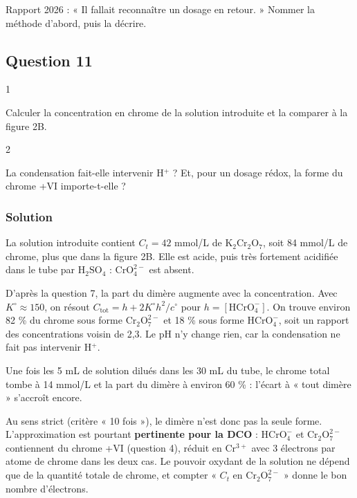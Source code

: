 \documentclass[11pt,a4paper]{article}
\begin{document}
\begin{jury}

Rapport 2026 : « Il fallait reconnaître un dosage en retour. » Nommer la méthode d'abord, puis la décrire.

\end{jury}

\hypertarget{question-11}{%
\subsection{Question 11}\label{question-11}}

\begin{indication}{1}

Calculer la concentration en chrome de la solution introduite et la comparer à la figure 2B.

\end{indication}

\begin{indication}{2}

La condensation fait-elle intervenir H\(^+\) ? Et, pour un dosage rédox, la forme du chrome +VI importe-t-elle ?

\end{indication}

\hypertarget{solution-10}{%
\subsubsection{Solution}\label{solution-10}}

La solution introduite contient \(C_t=42\) mmol/L de \(\mathrm{K_2Cr_2O_7}\), soit 84 mmol/L de chrome, plus que dans la figure 2B. Elle est acide, puis très fortement acidifiée dans le tube par \(\mathrm{H_2SO_4}\) : \(\mathrm{CrO_4^{2-}}\) est absent.

D'après la question 7, la part du dimère augmente avec la concentration. Avec \(K^\circ\approx150\), on résout \(C_{\text{tot}}=h+2K^\circ h^2/c^\circ\) pour \(h=[\mathrm{HCrO_4^-}]\). On trouve environ 82 \% du chrome sous forme \(\mathrm{Cr_2O_7^{2-}}\) et 18 \% sous forme \(\mathrm{HCrO_4^-}\), soit un rapport des concentrations voisin de 2,3. Le pH n'y change rien, car la condensation ne fait pas intervenir H\(^+\).

Une fois les 5 mL de solution dilués dans les 30 mL du tube, le chrome total tombe à 14 mmol/L et la part du dimère à environ 60 \% : l'écart à « tout dimère » s'accroît encore.

Au sens strict (critère « 10 fois »), le dimère n'est donc pas la seule forme. L'approximation est pourtant \textbf{pertinente pour la DCO} : \(\mathrm{HCrO_4^-}\) et \(\mathrm{Cr_2O_7^{2-}}\) contiennent du chrome +VI (question 4), réduit en Cr\(^{3+}\) avec 3 électrons par atome de chrome dans les deux cas. Le pouvoir oxydant de la solution ne dépend que de la quantité totale de chrome, et compter « \(C_t\) en \(\mathrm{Cr_2O_7^{2-}}\) » donne le bon nombre d'électrons.
\end{document}
